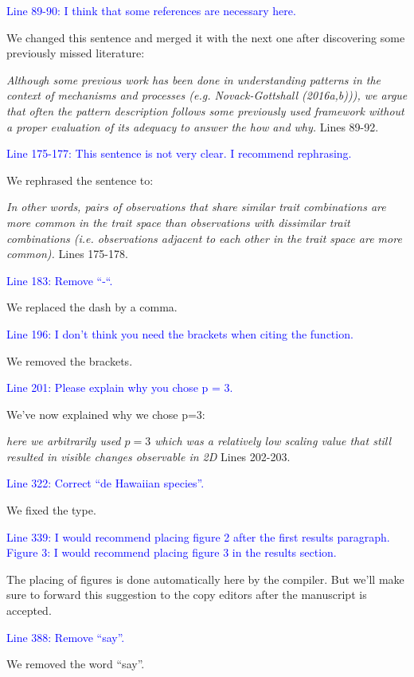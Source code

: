 \documentclass[
]{article}
\begin{document}
\textcolor{blue}{Line 89-90: I think that some references are necessary here.}

We changed this sentence and merged it with the next one after discovering some previously missed literature:

\textit{Although some previous work has been done in understanding patterns in the context of mechanisms and processes (e.g. Novack-Gottshall (2016a,b))), we argue that often the pattern description follows some previously used framework without a proper evaluation of its adequacy to answer the how and why.} Lines 89-92. %

\textcolor{blue}{Line 175-177: This sentence is not very clear. I recommend rephrasing.}

We rephrased the sentence to:

\textit{In other words, pairs of observations that share similar trait combinations are more common in the trait space than observations with dissimilar trait combinations (i.e. observations adjacent to each other in the trait space are more common).} Lines 175-178. %

\textcolor{blue}{Line 183: Remove “-“.}

We replaced the dash by a comma.

\textcolor{blue}{Line 196: I don’t think you need the brackets when citing the function. }

We removed the brackets.

\textcolor{blue}{Line 201: Please explain why you chose p = 3.}

We've now explained why we chose p=3:

\textit{here we arbitrarily used $p=3$ which was a relatively low scaling value that still resulted in visible changes observable in 2D} Lines 202-203.%

\textcolor{blue}{Line 322: Correct “de Hawaiian species”.}

We fixed the type.

\textcolor{blue}{Line 339: I would recommend placing figure 2 after the first results paragraph.}
\textcolor{blue}{Figure 3: I would recommend placing figure 3 in the results section. }

The placing of figures is done automatically here by the compiler.
But we'll make sure to forward this suggestion to the copy editors after the manuscript is accepted.

\textcolor{blue}{Line 388: Remove “say”.}

We removed the word ``say''.
\end{document}
